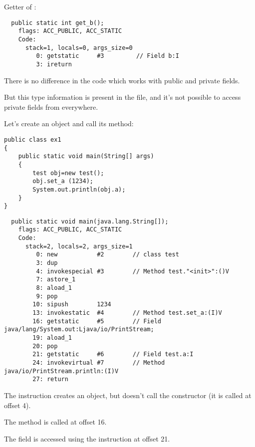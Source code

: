 Getter of :

\begin{lstlisting}
  public static int get_b();
    flags: ACC_PUBLIC, ACC_STATIC
    Code:
      stack=1, locals=0, args_size=0
         0: getstatic     #3         // Field b:I
         3: ireturn       
\end{lstlisting}

There is no difference in the code which works with public and private fields.

But this type information is present in the  file, 
and it's not possible to access private fields from everywhere.


Let's create an object and call its method:


\begin{lstlisting}[caption=ex1.java]
public class ex1
{
	public static void main(String[] args)
	{
		test obj=new test();
		obj.set_a (1234);
		System.out.println(obj.a);
	}
}
\end{lstlisting}

\begin{lstlisting}
  public static void main(java.lang.String[]);
    flags: ACC_PUBLIC, ACC_STATIC
    Code:
      stack=2, locals=2, args_size=1
         0: new           #2        // class test
         3: dup           
         4: invokespecial #3        // Method test."<init>":()V
         7: astore_1      
         8: aload_1       
         9: pop           
        10: sipush        1234
        13: invokestatic  #4        // Method test.set_a:(I)V
        16: getstatic     #5        // Field java/lang/System.out:Ljava/io/PrintStream;
        19: aload_1       
        20: pop           
        21: getstatic     #6        // Field test.a:I
        24: invokevirtual #7        // Method java/io/PrintStream.println:(I)V
        27: return        
\end{lstlisting}

The  instruction creates an object, but doesn't call the constructor (it is called at offset 4).

The  method is called at offset 16.

The  field is accessed using the  instruction at offset 21.

